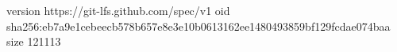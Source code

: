 version https://git-lfs.github.com/spec/v1
oid sha256:eb7a9e1cebeecb578b657e8e3e10b0613162ee1480493859bf129fcdae074baa
size 121113
